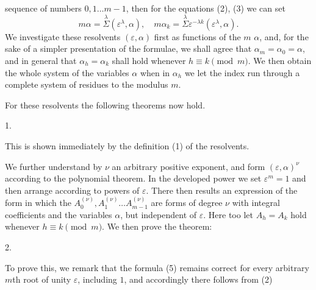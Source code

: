 
sequence of numbers $0, 1 \ldots m-1$, then for the equations (2), (3) we can set
\[
m\alpha = \overset{\lambda}{\Sigma}(\varepsilon^\lambda, \alpha), \quad m\alpha_k = \overset{\lambda}{\Sigma}\varepsilon^{-\lambda k}(\varepsilon^\lambda, \alpha).
\]
We investigate these resolvents $(\varepsilon, \alpha)$ first as functions of the $m$  $\alpha$, and, for the sake of a simpler presentation of the formulae, we shall agree that $\alpha_m = \alpha_0 = \alpha$, and in general that $\alpha_h = \alpha_k$ shall hold whenever $h \equiv k \pmod{m}$. We then obtain the whole system of the variables $\alpha$ when in $\alpha_h$ we let the index run through a complete system of residues to the modulus $m$.

For these resolvents the following theorems now hold.

1. 

This is shown immediately by the definition (1) of the resolvents.

We further understand by $\nu$ an arbitrary positive exponent, and form $(\varepsilon, \alpha)^\nu$ according to the polynomial theorem. In the developed power we set $\varepsilon^m = 1$ and then arrange according to powers of $\varepsilon$. There then results an expression of the form
in which the $A_0^{(\nu)}, A_1^{(\nu)} \ldots A_{m-1}^{(\nu)}$ are forms of degree $\nu$ with integral coefficients and the variables $\alpha$, but independent of $\varepsilon$. Here too let $A_h = A_k$ hold whenever $h \equiv k \pmod{m}$. We then prove the theorem:

2. 

To prove this, we remark that the formula (5) remains correct for every arbitrary $m$th root of unity $\varepsilon$, including $1$, and accordingly there follows from (2)
